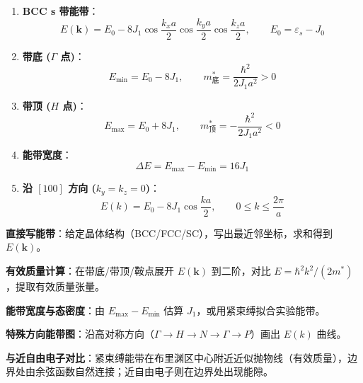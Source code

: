 \begin{formulabox}[核心公式]
\begin{enumerate}[label=\textbf{(\arabic*)}]
    \item \textbf{BCC s 带能带}：
    \[
    E(\mathbf{k})=E_0-8J_1\cos\frac{k_xa}{2}\cos\frac{k_ya}{2}\cos\frac{k_za}{2},
    \qquad E_0=\varepsilon_s-J_0
    \]

    \item \textbf{带底 ($\Gamma$ 点)}：
    \[
    E_{\min}=E_0-8J_1,\qquad m^*_{\text{底}}=\frac{\hbar^2}{2J_1a^2}>0
    \]

    \item \textbf{带顶 ($H$ 点)}：
    \[
    E_{\max}=E_0+8J_1,\qquad m^*_{\text{顶}}=-\frac{\hbar^2}{2J_1a^2}<0
    \]

    \item \textbf{能带宽度}：
    \[
    \Delta E=E_{\max}-E_{\min}=16J_1
    \]

    \item \textbf{沿 $[100]$ 方向 ($k_y=k_z=0$)}：
    \[
    E(k)=E_0-8J_1\cos\frac{ka}{2},\qquad 0\le k\le\frac{2\pi}{a}
    \]
\end{enumerate}
\end{formulabox}

\begin{drillbox}[训练点与考法变体]
 \textbf{直接写能带}：给定晶体结构（BCC/FCC/SC），写出最近邻坐标，求和得到 $E(\mathbf{k})$。

 \textbf{有效质量计算}：在带底/带顶/鞍点展开 $E(\mathbf{k})$ 到二阶，对比 $E=\hbar^2k^2/(2m^*)$，提取有效质量张量。

 \textbf{能带宽度与态密度}：由 $E_{\max}-E_{\min}$ 估算 $J_1$，或用紧束缚拟合实验能带。

 \textbf{特殊方向能带图}：沿高对称方向（$\Gamma\to H\to N\to\Gamma\to P$）画出 $E(k)$ 曲线。

 \textbf{与近自由电子对比}：紧束缚能带在布里渊区中心附近近似抛物线（有效质量），边界处由余弦函数自然连接；近自由电子则在边界处出现能隙。
\end{drillbox}

